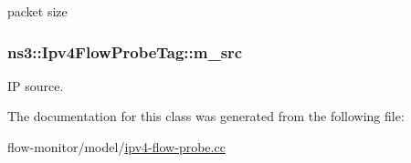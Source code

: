 packet size 

\subsubsection[{\texorpdfstring{m\+\_\+src}{m_src}}]{ ns3\+::\+Ipv4\+Flow\+Probe\+Tag\+::m\+\_\+src\hspace{0.3cm}{\ttfamily [private]}}\hypertarget{classns3_1_1Ipv4FlowProbeTag_afed6c12ddaf57c3c547473a54308cf5a}{}\label{classns3_1_1Ipv4FlowProbeTag_afed6c12ddaf57c3c547473a54308cf5a}


IP source. 



The documentation for this class was generated from the following file\+:\begin{DoxyCompactItemize}
\item 
flow-\/monitor/model/\hyperlink{ipv4-flow-probe_8cc}{ipv4-\/flow-\/probe.\+cc}\end{DoxyCompactItemize}

